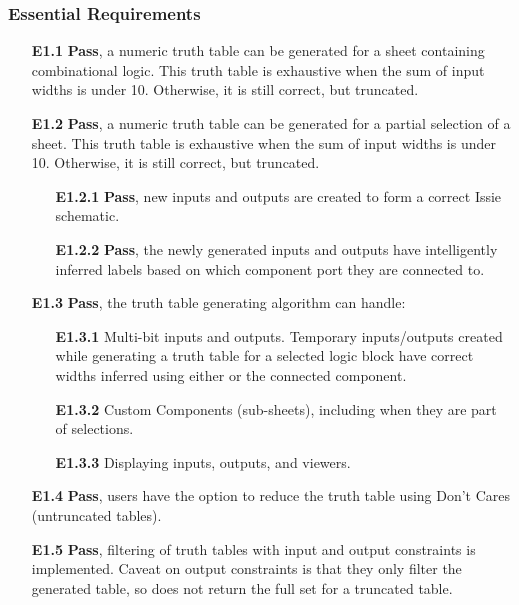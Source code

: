 \subsubsection*{Essential Requirements}
\begin{itemize}
    \item[\textbf{E1.1}] \textbf{Pass}, a numeric truth table can be generated for a sheet containing combinational logic. This truth table is exhaustive when the sum of input widths is under 10. Otherwise, it is still correct, but truncated.
    \medskip
    \item[\textbf{E1.2}] \textbf{Pass}, a numeric truth table can be generated for a partial selection of a sheet. This truth table is exhaustive when the sum of input widths is under 10. Otherwise, it is still correct, but truncated.
    \begin{itemize}
        \item[\textbf{E1.2.1}] \textbf{Pass}, new inputs and outputs are created to form a correct Issie schematic.
        \item[\textbf{E1.2.2}] \textbf{Pass}, the newly generated inputs and outputs have intelligently inferred labels based on which component port they are connected to.
    \end{itemize}
    \medskip
    \item[\textbf{E1.3}] \textbf{Pass}, the truth table generating algorithm can handle:
    \begin{itemize}
        \item[\textbf{E1.3.1}] Multi-bit inputs and outputs. Temporary inputs/outputs created while generating a truth table for a selected logic block  have correct widths inferred using either  or the connected component.
        \item[\textbf{E1.3.2}] Custom Components (sub-sheets), including when they are part of selections.
        \item[\textbf{E1.3.3}] Displaying inputs, outputs, and viewers.
    \end{itemize}
    \medskip
    \item[\textbf{E1.4}] \textbf{Pass}, users have the option to reduce the truth table using Don't Cares (untruncated tables).
    \medskip
    \item[\textbf{E1.5}] \textbf{Pass}, filtering of truth tables with input and output constraints is implemented. Caveat on output constraints is that they only filter the generated table, so does not return the full set for a truncated table.

\end{itemize}
